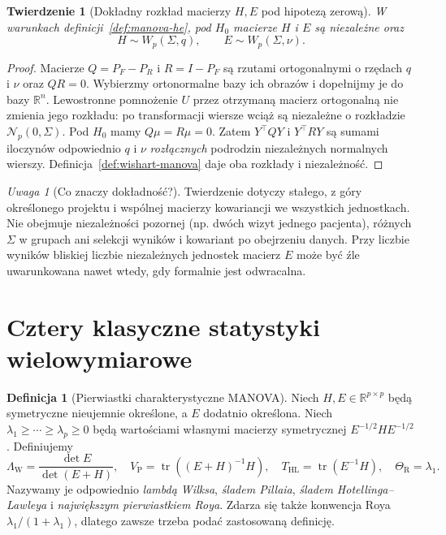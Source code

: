 \documentclass[11pt,a4paper,oneside]{report}
\numberwithin{equation}{chapter}
\theoremstyle{plain}
\newtheorem{twierdzenie}{Twierdzenie}[chapter]
\theoremstyle{definition}
\newtheorem{definicja}{Definicja}[chapter]
\theoremstyle{remark}
\newtheorem{uwaga}{Uwaga}[chapter]
\newcommand{\R}{\mathbb R}
\newcommand{\Normal}{\mathcal N}
\begin{document}
\begin{twierdzenie}[Dokładny rozkład macierzy $H,E$ pod hipotezą zerową]\label{thm:wishart-he}
W warunkach definicji~\ref{def:manova-he}, pod $H_0$ macierze $H$ i $E$ są niezależne oraz
\[
 H\sim W_p(\Sigma,q),\qquad E\sim W_p(\Sigma,\nu).
\]
\end{twierdzenie}
\begin{proof}
Macierze $Q=P_F-P_R$ i $R=I-P_F$ są rzutami ortogonalnymi o rzędach $q$ i $\nu$ oraz $QR=0$. Wybierzmy ortonormalne bazy ich obrazów i dopełnijmy je do bazy $\R^n$. Lewostronne pomnożenie $U$ przez otrzymaną macierz ortogonalną nie zmienia jego rozkładu: po transformacji wiersze wciąż są niezależne o rozkładzie $\Normal_p(0,\Sigma)$. Pod $H_0$ mamy $Q\mu=R\mu=0$. Zatem $Y^\top QY$ i $Y^\top RY$ są sumami iloczynów odpowiednio $q$ i $\nu$ \emph{rozłącznych} podrodzin niezależnych normalnych wierszy. Definicja~\ref{def:wishart-manova} daje oba rozkłady i niezależność.
\end{proof}

\begin{uwaga}[Co znaczy dokładność?]
Twierdzenie dotyczy stałego, z góry określonego projektu i wspólnej macierzy kowariancji we wszystkich jednostkach. Nie obejmuje niezależności pozornej (np. dwóch wizyt jednego pacjenta), różnych $\Sigma$ w grupach ani selekcji wyników i kowariant po obejrzeniu danych. Przy liczbie wyników bliskiej liczbie niezależnych jednostek macierz $E$ może być źle uwarunkowana nawet wtedy, gdy formalnie jest odwracalna.
\end{uwaga}

\section{Cztery klasyczne statystyki wielowymiarowe}
\begin{definicja}[Pierwiastki charakterystyczne MANOVA]\label{def:manova-roots}
Niech $H,E\in\R^{p\times p}$ będą symetryczne nieujemnie określone, a $E$ dodatnio określona. Niech $\lambda_1\ge\cdots\ge\lambda_p\ge0$ będą wartościami własnymi macierzy symetrycznej $E^{-1/2}HE^{-1/2}$. Definiujemy
\[
 \Lambda_{\mathrm W}=\frac{\det E}{\det(E+H)},\quad
 V_{\mathrm P}=\operatorname{tr}((E+H)^{-1}H),\quad
 T_{\mathrm{HL}}=\operatorname{tr}(E^{-1}H),\quad
 \Theta_{\mathrm R}=\lambda_1.
\]
Nazywamy je odpowiednio \emph{lambdą Wilksa}, \emph{śladem Pillaia}, \emph{śladem Hotellinga--Lawleya} i \emph{największym pierwiastkiem Roya}. Zdarza się także konwencja Roya $\lambda_1/(1+\lambda_1)$, dlatego zawsze trzeba podać zastosowaną definicję.
\end{definicja}
\end{document}
